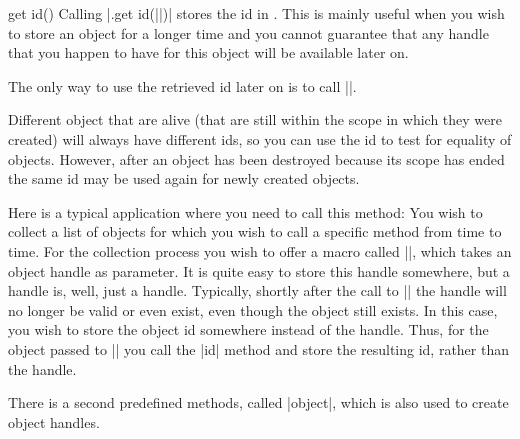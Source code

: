 \begin{predefinedmethod}{get id()}
  Calling |.get id(||)|  stores the id  in
  . This is mainly useful when you wish to store an
  object for a longer time and you cannot guarantee that any handle
  that you happen to have for this object will be available later on.

  The only way to use the retrieved id later on is to call
  |\pgfooobj|.

  Different object that are alive (that are still within the scope in
  which they were created) will always have different ids, so you can
  use the id to test for equality of objects. However, after an object
  has been destroyed because its scope has ended the same id may be
  used again for newly created objects.

  Here is a typical application where you need to call this method:
  You wish to collect a list of objects for which you wish to call a
  specific method from time to time. For the collection process you
  wish to offer a macro called |\addtoobjectlist|, which takes an
  object handle as parameter. It is quite easy to store this handle
  somewhere, but a handle is, well, just a handle. Typically, shortly
  after the call to |\addtoobjectlist| the handle will no longer be
  valid or even exist, even though the object still exists. In this
  case, you wish to store the object id somewhere instead of the
  handle. Thus, for the object passed to |\addtoobjectlist| you call
  the |id| method and store the resulting id, rather than the handle. 
\end{predefinedmethod}

There is a second predefined methods, called |object|, which is also
used to create object handles.





